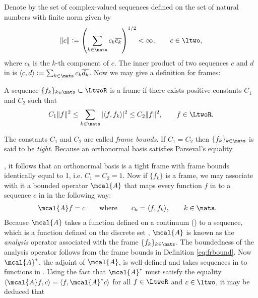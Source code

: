 \documentclass[a4paper, 12pt,preprint]{article}
\begin{document}
 Denote by \ltwo the set of  complex-valued sequences defined on the set of natural numbers \nats with finite norm given by 
 \begin{align}
   \Vert c \Vert := \left( \sum_{k \in \nats} c_k \overline{c_k} \right)^{1/2} <   \infty, \qquad c \in \ltwo,\notag
   \label{}
 \end{align}
 where $c_k$ is the $k$-th component of $c$. The inner product of two sequences $c$ and $d$ in \ltwo is $\langle c, d \rangle := \sum_{k \in \nats} c_k \overline{d_k}$. Now we may give a definition for frames:
\begin{defn}\label{eq:frbound}
   A sequence $\{f_k\}_{k \in \nats} \subset \LtwoR$ is a frame if there exists positive constants $C_1$ and $C_2$ such that
  \begin{align}
    C_1\Vert f \Vert^2 \le \sum_{k \in \nats}\vert \langle f, f_k\rangle \vert^2 \le  C_2 \Vert f \Vert^2,
  \qquad   f \in \LtwoR. \notag 
  \end{align}
\end{defn}
\noindent The  constants $C_1$ and $C_2$ are called   \emph{frame bounds}. If $C_1 = C_2$ then $\{f_k \}_{k \in \nats}$ is said to be \emph{tight}. Because an  orthonormal basis satisfies  Parseval's equality\begin{comment}\footnote{
  Parseval's equality states that if $\{f_k\}_{k \in \nats}$ is an orthonormal basis for $\mcal{H}$, a separable Hilbert space, then
  \begin{align}
    \Vert f \Vert^2 = \sum_{k \in \nats} \vert \langle f, f_k \rangle \vert^2 =\Vert \hat{f} \Vert^2, \qquad  f \in \mcal{H},  \notag
    \label{}
  \end{align}
  where $\hat{f}$ is the Fourier transform of $f$.
}\end{comment}
, it follows that an orthonormal basis is a tight frame with frame bounds identically equal to 1, i.e. $C_1 = C_2 = 1$.  Now if $\{f_k\}$ is a frame, we may associate with it a bounded operator $\mcal{A}$ that maps every function  $f$ in  \LtwoR to a sequence $c$ in \ltwo in the following way:
\begin{align}
  &\mcal{A} f  = c \qquad \text{where} \qquad c_k = \langle f, f_k\rangle, \qquad  k \in \nats. 
  \label{eq:analysis}
\end{align}
Because $\mcal{A}$ takes a function defined on a continuum (\real) to a sequence, which is a function defined on the discrete set \nats, $\mcal{A}$ is known as the \emph{analysis} operator associated with the frame $\{f_k\}_{k \in \nats}$. The boundedness of the analysis operator follows from the frame bounds in  Definition \eqref{eq:frbound}. Now $\mcal{A}^*$, the adjoint   of $\mcal{A}$, is well-defined and takes sequences in \ltwo to functions in \LtwoR.  Using the fact that  $\mcal{A}^*$ must satisfy the equality $\langle \mcal{A} f  , c\rangle = \langle f,\mcal{A}^*c\rangle$ for all $f \in \LtwoR$ and $c \in \ltwo$, it may be deduced that
\end{document}
